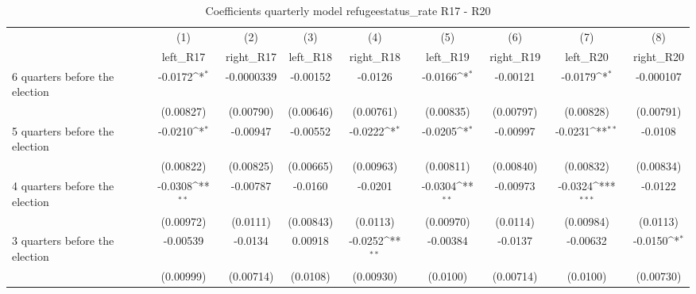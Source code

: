 \begin{table}[htbp]\centering
\def\sym#1{\ifmmode^{#1}\else\(^{#1}\)\fi}
\caption{Coefficients quarterly model refugeestatus\_rate R17 - R20}
\begin{tabular}{l*{8}{c}}
\hline\hline
                    &\multicolumn{1}{c}{(1)}&\multicolumn{1}{c}{(2)}&\multicolumn{1}{c}{(3)}&\multicolumn{1}{c}{(4)}&\multicolumn{1}{c}{(5)}&\multicolumn{1}{c}{(6)}&\multicolumn{1}{c}{(7)}&\multicolumn{1}{c}{(8)}\\
                    &\multicolumn{1}{c}{left\_R17}&\multicolumn{1}{c}{right\_R17}&\multicolumn{1}{c}{left\_R18}&\multicolumn{1}{c}{right\_R18}&\multicolumn{1}{c}{left\_R19}&\multicolumn{1}{c}{right\_R19}&\multicolumn{1}{c}{left\_R20}&\multicolumn{1}{c}{right\_R20}\\
\hline
 6 quarters before the election&     -0.0172\sym{*}  &  -0.0000339         &    -0.00152         &     -0.0126         &     -0.0166\sym{*}  &    -0.00121         &     -0.0179\sym{*}  &   -0.000107         \\
                    &   (0.00827)         &   (0.00790)         &   (0.00646)         &   (0.00761)         &   (0.00835)         &   (0.00797)         &   (0.00828)         &   (0.00791)         \\
[1em]
 5 quarters before the election&     -0.0210\sym{*}  &    -0.00947         &    -0.00552         &     -0.0222\sym{*}  &     -0.0205\sym{*}  &    -0.00997         &     -0.0231\sym{**} &     -0.0108         \\
                    &   (0.00822)         &   (0.00825)         &   (0.00665)         &   (0.00963)         &   (0.00811)         &   (0.00840)         &   (0.00832)         &   (0.00834)         \\
[1em]
 4 quarters before the election&     -0.0308\sym{**} &    -0.00787         &     -0.0160         &     -0.0201         &     -0.0304\sym{**} &    -0.00973         &     -0.0324\sym{***}&     -0.0122         \\
                    &   (0.00972)         &    (0.0111)         &   (0.00843)         &    (0.0113)         &   (0.00970)         &    (0.0114)         &   (0.00984)         &    (0.0113)         \\
[1em]
 3 quarters before the election&    -0.00539         &     -0.0134         &     0.00918         &     -0.0252\sym{**} &    -0.00384         &     -0.0137         &    -0.00632         &     -0.0150\sym{*}  \\
                    &   (0.00999)         &   (0.00714)         &    (0.0108)         &   (0.00930)         &    (0.0100)         &   (0.00714)         &    (0.0100)         &   (0.00730)         \\

\end{tabular}
\end{table}
